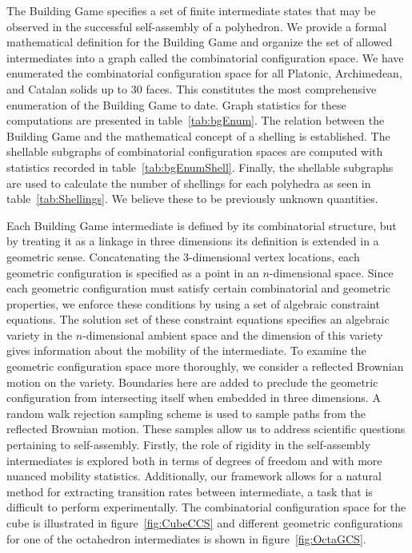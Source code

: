 The Building Game specifies a set of finite intermediate states that may be observed in the successful self-assembly of a polyhedron. We provide a formal mathematical definition for the Building Game and organize the set of allowed intermediates into a graph called the combinatorial configuration space. We have enumerated the combinatorial configuration space for all Platonic, Archimedean, and Catalan solids up to 30 faces. This constitutes the most comprehensive enumeration of the Building Game to date. Graph statistics for these computations are presented in table~\ref{tab:bgEnum}. The relation between the Building Game and the mathematical concept of a shelling is established. The shellable subgraphs of combinatorial configuration spaces are computed with statistics recorded in table~\ref{tab:bgEnumShell}. Finally, the shellable subgraphs are used to calculate the number of shellings for each polyhedra as seen in table~\ref{tab:Shellings}. We believe these to be previously unknown quantities. 
 





Each Building Game intermediate is defined by its combinatorial structure, but by treating it as a linkage in three dimensions its definition is extended in a geometric sense. Concatenating the 3-dimensional vertex locations, each geometric configuration is specified as a point in an $n$-dimensional space. Since each geometric configuration must satisfy certain combinatorial and geometric properties, we enforce these conditions by using a set of algebraic constraint equations. The solution set of these constraint equations specifies an algebraic variety in the $n$-dimensional ambient space and the dimension of this variety gives information about the mobility of the intermediate. To examine the geometric configuration space more thoroughly, we consider a reflected Brownian motion on the variety. Boundaries here are added to preclude the geometric configuration from intersecting itself when embedded in three dimensions. A random walk rejection sampling scheme is used to sample paths from the reflected Brownian motion. These samples allow us to address scientific questions pertaining to self-assembly. Firstly, the role of rigidity in the self-assembly intermediates is explored both in terms of degrees of freedom and with more nuanced mobility statistics. Additionally, our framework allows for a natural method for extracting transition rates between intermediate, a task that is difficult to perform experimentally. The combinatorial configuration space for the cube is illustrated in figure~\ref{fig:CubeCCS} and different geometric configurations for one of the octahedron intermediates is shown in figure~\ref{fig:OctaGCS}.


